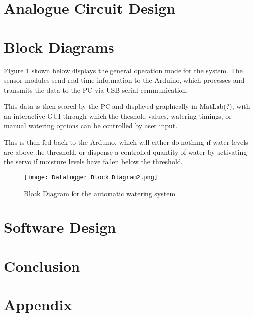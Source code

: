 \documentclass[a4paper,11pt]{article}
\begin{document}
\section{Analogue Circuit Design}
\label{sec:Analogue_Circuit_Design}

\section{Block Diagrams}
\label{sec:Block_Diagrams}

Figure \ref{fig:Block_Diagram_for_the_automatic_watering_system}
shown below displays the general operation mode for the system.
The sensor modules send real-time information to the Arduino,
which processes and transmits the data to the PC via USB serial communication.

This data is then stored by the PC and displayed graphically in MatLab(?), 
with an interactive GUI through which the 
theshold values, watering timings, or manual watering options
can be controlled by user input.

This is then fed back to the Arduino, 
which will either do nothing if water levels are above the threshold,
or dispense a controlled quantity of water by activating the servo
if moisture levels have fallen below the threshold.

\begin{figure}[H]
    \centering
    \texttt{[image: DataLogger Block Diagram2.png]}
    \caption{Block Diagram for the automatic watering system}
    \label{fig:Block_Diagram_for_the_automatic_watering_system}
\end{figure}

\section{Software Design}
\label{sec:Software_Design}

\section{Conclusion}
\label{sec:Conclusion}

\appendix
\section{Appendix}
\end{document}
